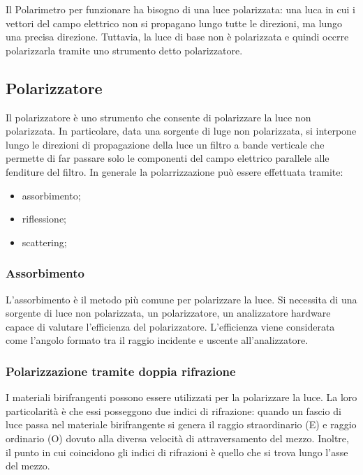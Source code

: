 \documentclass{article}
\begin{document}
Il Polarimetro per funzionare ha bisogno di una luce polarizzata: una luca in cui i vettori del campo elettrico non si propagano lungo tutte le direzioni, ma lungo una precisa direzione. Tuttavia, la luce di base non è polarizzata e quindi occrre polarizzarla tramite uno strumento detto polarizzatore.
\subsection{Polarizzatore}
Il polarizzatore è uno strumento che consente di polarizzare la luce non polarizzata. In particolare, data una sorgente di luge non polarizzata, si interpone lungo le direzioni di propagazione della luce un filtro a bande verticale che permette di far passare solo le componenti del campo elettrico parallele alle fenditure del filtro.
In generale la polarrizzazione può essere effettuata tramite:\begin{itemize}
	\item assorbimento;
	\item riflessione;
	\item scattering;
\end{itemize}
\subsubsection{Assorbimento}
L'assorbimento è il metodo più comune per polarizzare la luce. Si necessita di una sorgente di luce non polarizzata, un polarizzatore, un analizzatore hardware capace di valutare l'efficienza del polarizzatore. L'efficienza viene considerata come l'angolo formato tra il raggio incidente e uscente all'analizzatore.
\subsubsection{Polarizzazione tramite doppia rifrazione}
I materiali birifrangenti possono essere utilizzati per la polarizzare la luce. La loro particolarità è che essi posseggono due indici di rifrazione: quando un fascio di luce passa nel materiale birifrangente si genera il raggio straordinario (E) e raggio ordinario (O) dovuto alla diversa velocità di attraversamento del mezzo.\newline
Inoltre, il punto in cui coincidono gli indici di rifrazioni è quello che si trova lungo l'asse del mezzo.
\end{document}
